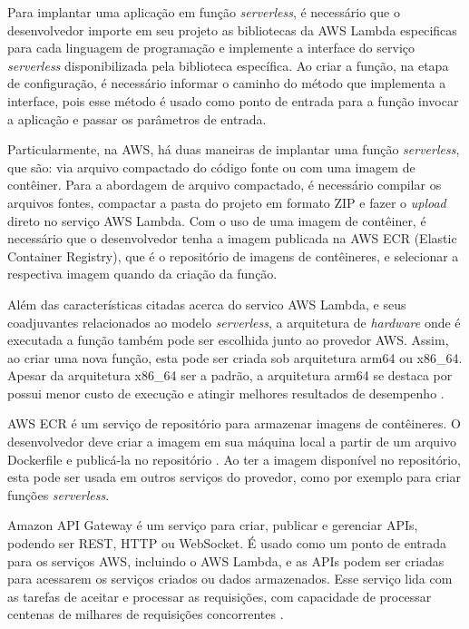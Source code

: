 \documentclass[conference]{IEEEtran}
\begin{document}
Para implantar uma aplicação em função \textit{serverless}, é necessário que o desenvolvedor importe em seu projeto as bibliotecas da AWS Lambda especificas para cada linguagem de programação e implemente a interface do serviço \textit{serverless} disponibilizada pela biblioteca específica. Ao criar a função, na etapa de configuração, é necessário informar o caminho do método que implementa a interface, pois esse método é usado como ponto de entrada para a função invocar a aplicação e passar os parâmetros de entrada.

Particularmente, na AWS, há duas maneiras de implantar uma função \textit{serverless}, que são: via arquivo compactado do código fonte ou com uma imagem de contêiner. Para a abordagem de arquivo compactado, é necessário compilar os arquivos fontes, compactar a pasta do projeto em formato ZIP e fazer o \textit{upload} direto no serviço AWS Lambda. Com o uso de uma imagem de contêiner, é necessário que o desenvolvedor tenha a imagem publicada na AWS ECR (Elastic Container Registry), que é o repositório de imagens de contêineres, e selecionar a respectiva imagem quando da criação da função.

Além das características citadas acerca do servico AWS Lambda, e seus coadjuvantes relacionados ao modelo \textit{serverless}, a arquitetura de \textit{hardware} onde é executada a função também pode ser escolhida junto ao provedor AWS. Assim, ao criar uma nova função, esta pode ser criada sob arquitetura arm64 ou x86\_64. Apesar da arquitetura x86\_64 ser a padrão, a arquitetura arm64 se destaca por possui menor custo de execução e atingir melhores resultados de desempenho
\cite{aws_2023_aws_lambda_architectures}.

AWS ECR é um serviço de repositório para armazenar imagens de contêineres. O desenvolvedor deve criar a imagem em sua máquina local a partir de um arquivo Dockerfile e publicá-la no repositório \cite{aws_2023_aws_ecr}. Ao ter a imagem disponível no repositório, esta pode ser usada em outros serviços do provedor, como por exemplo para criar funções \textit{serverless}.

Amazon API Gateway é um serviço para criar, publicar e gerenciar APIs, podendo ser REST, HTTP ou WebSocket. É usado como um ponto de entrada para os serviços AWS, incluindo o AWS Lambda, e as APIs podem ser criadas para acessarem os serviços criados ou dados armazenados. Esse serviço lida com as tarefas de aceitar e processar as requisições, com capacidade de processar centenas de milhares de requisições concorrentes \cite{aws_2023_what_is_api_gateway}. 
\end{document}
